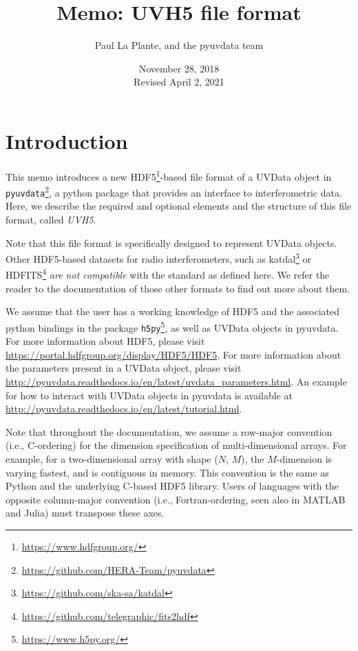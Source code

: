 \documentclass[11pt, oneside]{article}
\title{Memo: UVH5 file format}
\author{Paul La Plante, and the pyuvdata team}
\date{November 28, 2018\\
Revised April 2, 2021}
\begin{document}
\maketitle
\tableofcontents
\section{Introduction}
\label{sec:intro}
This memo introduces a new HDF5\footnote{\url{https://www.hdfgroup.org/}}-based
file format of a UVData object in
\verb+pyuvdata+\footnote{\url{https://github.com/HERA-Team/pyuvdata}}, a python
package that provides an interface to interferometric data. Here, we describe
the required and optional elements and the structure of this file format, called
\textit{UVH5}.

Note that this file format is specifically designed to represent UVData
objects. Other HDF5-based datasets for radio interferometers, such as
katdal\footnote{\url{https://github.com/ska-sa/katdal}} or
HDFITS\footnote{\url{https://github.com/telegraphic/fits2hdf}} \textit{are not
  compatible} with the standard as defined here. We refer the reader to the
documentation of those other formats to find out more about them.

We assume that the user has a working knowledge of HDF5 and the associated
python bindings in the package \verb+h5py+\footnote{\url{https://www.h5py.org/}}, as
well as UVData objects in pyuvdata. For more information about HDF5, please
visit \url{https://portal.hdfgroup.org/display/HDF5/HDF5}. For more information
about the parameters present in a UVData object, please visit
\url{http://pyuvdata.readthedocs.io/en/latest/uvdata_parameters.html}. An
example for how to interact with UVData objects in pyuvdata is available at
\url{http://pyuvdata.readthedocs.io/en/latest/tutorial.html}.

Note that throughout the documentation, we assume a row-major convention (i.e.,
C-ordering) for the dimension specification of multi-dimensional arrays. For
example, for a two-dimensional array with shape ($N$, $M$), the $M$-dimension is
varying fastest, and is contiguous in memory. This convention is the same as
Python and the underlying C-based HDF5 library. Users of languages with the
opposite column-major convention (i.e., Fortran-ordering, seen also in MATLAB
and Julia) must transpose these axes.
\end{document}
